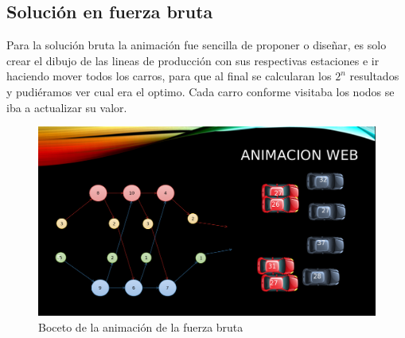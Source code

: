 \documentclass[12 pt]{report}
\begin{document}
\subsection{Solución en fuerza bruta}
Para la solución bruta la animación fue sencilla de proponer o diseñar, es solo crear el dibujo de las lineas de producción con sus respectivas estaciones e ir haciendo mover todos los carros, para que al final se calcularan los $2^n$ resultados y pudiéramos ver cual era el optimo. Cada carro conforme visitaba los nodos se iba a actualizar su valor.
\begin{figure}[h!]
  \centering
  \includegraphics[scale = 0.3]{brutaAnim}
  \caption{Boceto de la animación de la fuerza bruta}
\end{figure}
\end{document}
